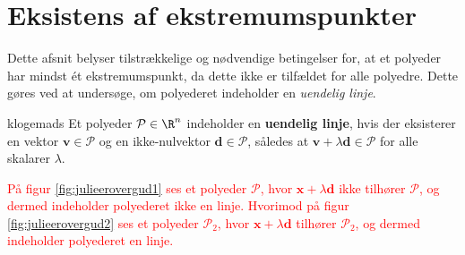 \section{Eksistens af ekstremumspunkter}
%
Dette afsnit belyser tilstrækkelige og nødvendige betingelser for, at et polyeder har mindst ét ekstremumspunkt, da dette ikke er tilfældet for alle polyedre. 
Dette gøres ved at undersøge, om polyederet indeholder en \textit{uendelig linje}.
%
\begin{defn}{}{klogemads}
Et polyeder $\mathcal{P} \in \R^n$ indeholder en \textbf{uendelig linje}, hvis der eksisterer en vektor $\textbf{v} \in \mathcal{P}$ og en ikke-nulvektor $\textbf{d} \in \mathcal{P}$, således at $\textbf{v} + \lambda \textbf{d} \in \mathcal{P}$ for alle skalarer $\lambda$.
\end{defn}
\noindent
%
\textcolor{red}{
På figur \ref{fig:julieerovergud1} ses et polyeder $\mathcal{P}$, hvor $\mathbf{x} + \lambda \mathbf{d}$ ikke tilhører $\mathcal{P}$, og dermed indeholder polyederet ikke en linje. 
Hvorimod på figur \ref{fig:julieerovergud2} ses et polyeder $\mathcal{P}_2$, hvor $\mathbf{x} + \lambda \mathbf{d}$ tilhører $\mathcal{P}_2$, og dermed indeholder polyederet en linje.
}
\\\\
